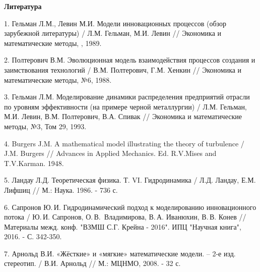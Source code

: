 \begin{center}

{\bf Литература}

\end{center}

1. Гельман Л.М., Левин М.И. Модели инновационных процессов (обзор
зарубежной литературы) / Л.М. Гельман,  М.И. Левин // Экономика и
математические методы, , 1989.

2. Полтерович В.М. Эволюционная модель взаимодействия процессов
создания и заимствования технологий /
\linebreak
В.М. Полтерович, Г.М. Хенкин
// Экономика и математические методы, №6, 1988.

3. Гельман Л.М. Моделирование динамики распределения предприятий
отрасли по уровням эффективности (на примере черной металлургии) /
Л.М. Гельман, М.И. Левин, В.М. Полтерович, В.А. Спивак // Экономика
и математические методы, №3, Том 29, 1993.


4. Burgers J.M. A mathematical model illustrating the theory of
turbulence / J.M. Burgers // Advances in Applied Mechanics. Ed.
R.V.Mises and T.V.Karman. 1948.


5. Ландау Л.Д. Теоретическая физика. Т. VI. Гидродинамика / Л.Д.
Ландау, Е.М. Лифшиц //  М.: Наука. 1986. - 736 с.

6. Сапронов Ю.\,И. Гидродинамический подход к моделированию
инновационного потока / Ю.\,И. Сапронов,
\linebreak
О.\,В.~Владимирова, В.\,А.
Иванюхин, В.\,В. Конев // Материалы межд. конф. "ВЗМШ С.Г. Крейна -
2016". ИПЦ "Научная книга", 2016. - С. 342-350.

7. Арнольд В.И. «Жёсткие» и «мягкие» математические модели. – 2-е
изд. стереотип. / В.И. Арнольд // М.: МЦНМО, 2008. - 32 с.
